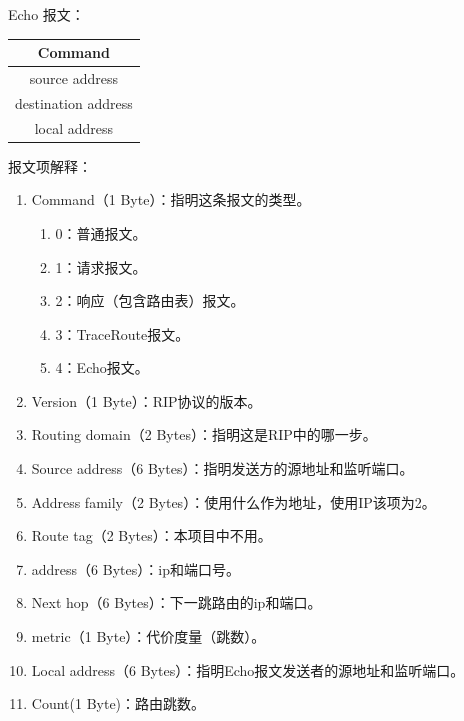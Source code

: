 	Echo 报文：
	\begin{table}[H]
	\centering
		\begin{tabular}{|c|}
			\hline
			Command \\
			\hline
			source address \\
			\hline
			destination address \\
			\hline
			local address \\
			\hline
		\end{tabular}		
	\end{table}
	报文项解释：
	\begin{enumerate}
		\item Command（1 Byte）：指明这条报文的类型。
		\begin{enumerate}[]
			\item 0：普通报文。
			\item 1：请求报文。
			\item 2：响应（包含路由表）报文。
			\item 3：TraceRoute报文。
			\item 4：Echo报文。
		\end{enumerate}
		\item Version（1 Byte）：RIP协议的版本。
		\item Routing domain（2 Bytes）：指明这是RIP中的哪一步。
		\item Source address（6 Bytes）：指明发送方的源地址和监听端口。
		\item Address family（2 Bytes）：使用什么作为地址，使用IP该项为2。
		\item Route tag（2 Bytes）：本项目中不用。
		\item address（6 Bytes）：ip和端口号。
		\item Next hop（6 Bytes）：下一跳路由的ip和端口。
		\item metric（1 Byte）：代价度量（跳数）。
		\item Local address（6 Bytes）：指明Echo报文发送者的源地址和监听端口。
		\item Count(1 Byte)：路由跳数。
	\end{enumerate}
